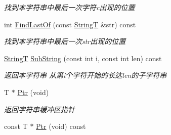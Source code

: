 \begin{DoxyCompactItemize}
\begin{DoxyCompactList}\small\item\em 找到本字符串中最后一次字符c出现的位置 \end{DoxyCompactList}\item 
int \hyperlink{class_util_1_1_string_t_add578f65b0bd9cc1b31a3ac84ce266f2}{Find\-Last\-Of} (const \hyperlink{class_util_1_1_string_t}{String\-T} \&str) const 
\begin{DoxyCompactList}\small\item\em 找到本字符串中最后一次str出现的位置 \end{DoxyCompactList}\item 
\hyperlink{class_util_1_1_string_t}{String\-T} \hyperlink{class_util_1_1_string_t_a40cddcbb6456c342921277582c1bb4e7}{Sub\-String} (const int i, const int len) const 
\begin{DoxyCompactList}\small\item\em 返回本字符串 从第i个字符开始的长达len的子字符串 \end{DoxyCompactList}\item 
\hypertarget{class_util_1_1_string_t_aa7de511b08d96d68ce12457172c1fa2c}{T $\ast$ \hyperlink{class_util_1_1_string_t_aa7de511b08d96d68ce12457172c1fa2c}{Ptr} (void)}\label{class_util_1_1_string_t_aa7de511b08d96d68ce12457172c1fa2c}

\begin{DoxyCompactList}\small\item\em 返回字符串缓冲区指针 \end{DoxyCompactList}\item 
\hypertarget{class_util_1_1_string_t_ab7ec1fe1e59636798f17b185b1df1aa4}{const T $\ast$ \hyperlink{class_util_1_1_string_t_ab7ec1fe1e59636798f17b185b1df1aa4}{Ptr} (void) const }\label{class_util_1_1_string_t_ab7ec1fe1e59636798f17b185b1df1aa4}


\end{DoxyCompactItemize}
